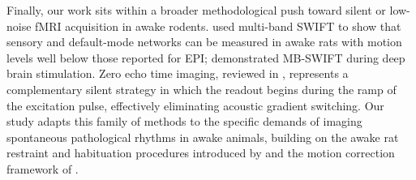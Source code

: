 Finally, our work sits within a broader methodological push toward silent or low-noise fMRI acquisition in awake rodents. \citet{paasonen2018,paasonen2020} used multi-band SWIFT to show that sensory and default-mode networks can be measured in awake rats with motion levels well below those reported for EPI; \citet{lehto2017} demonstrated MB-SWIFT during deep brain stimulation. Zero echo time imaging, reviewed in \citet{wiesinger2022}, represents a complementary silent strategy in which the readout begins during the ramp of the excitation pulse, effectively eliminating acoustic gradient switching. Our study adapts this family of methods to the specific demands of imaging spontaneous pathological rhythms in awake animals, building on the awake rat restraint and habituation procedures introduced by \citet{stenroos2018} and the motion correction framework of \citet{power2012}.
